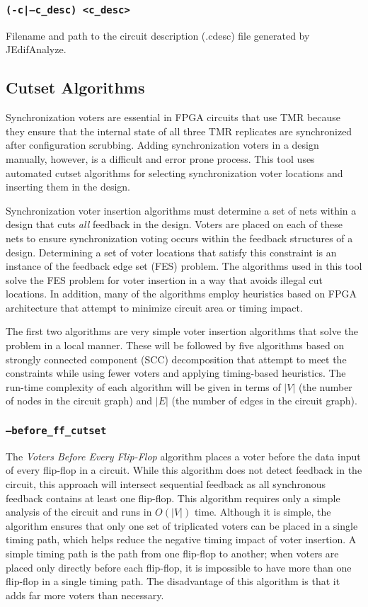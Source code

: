 \subsubsection{\texttt{(-c|--c\_desc) <c\_desc>}}
Filename and path to the circuit description (.cdesc) file generated by
JEdifAnalyze.

\subsection{Cutset Algorithms}

Synchronization voters are essential in FPGA circuits that use TMR
because they ensure that the internal state of all three TMR
replicates are synchronized after configuration scrubbing.  Adding
synchronization voters in a design manually, however, is a difficult
and error prone process.  This tool uses automated cutset algorithms
for selecting synchronization voter locations and inserting them in
the design.

Synchronization voter insertion algorithms must determine a set of
nets within a design that cuts {\em all} feedback in the
design. Voters are placed on each of these nets to ensure
synchronization voting occurs within the feedback structures of a
design.  Determining a set of voter locations that satisfy this
constraint is an instance of the feedback edge set (FES) problem. The
algorithms used in this tool solve the FES problem for voter insertion
in a way that avoids illegal cut locations. In addition, many of the
algorithms employ heuristics based on FPGA architecture that attempt
to minimize circuit area or timing impact.

The first two algorithms are very simple voter insertion algorithms
that solve the problem in a local manner. These will be followed by
five algorithms based on strongly connected component (SCC)
decomposition that attempt to meet the constraints while using fewer
voters and applying timing-based heuristics. The run-time complexity
of each algorithm will be given in terms of $|V|$ (the number of nodes
in the circuit graph) and $|E|$ (the number of edges in the circuit
graph).

\subsubsection{\texttt{--before\_ff\_cutset}}
The \emph{Voters Before Every Flip-Flop} algorithm places a voter
before the data input of every flip-flop in a circuit.  While this
algorithm does not detect feedback in the circuit, this approach will
intersect sequential feedback as all synchronous feedback contains at
least one flip-flop.  This algorithm requires only a simple analysis
of the circuit and runs in $O(|V|)$ time. Although it is simple, the
algorithm ensures that only one set of triplicated voters can be
placed in a single timing path, which helps reduce the negative timing
impact of voter insertion. A simple timing path is the path from one
flip-flop to another; when voters are placed only directly before each
flip-flop, it is impossible to have more than one flip-flop in a
single timing path. The disadvantage of this algorithm is that it adds
far more voters than necessary.


